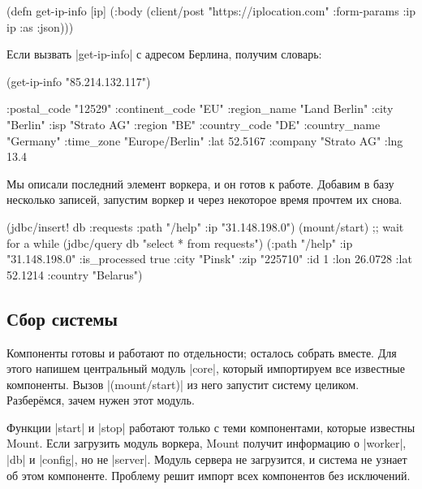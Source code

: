 \begin{english}
  \begin{clojure}
(defn get-ip-info [ip]
  (:body (client/post "https://iplocation.com"
                      {:form-params {:ip ip}
                       :as :json})))
  \end{clojure}
\end{english}

Если вызвать \spverb|get-ip-info| с адресом Берлина, получим словарь:

\begin{english}
  \begin{clojure}
(get-ip-info "85.214.132.117")

{:postal_code "12529"
 :continent_code "EU"
 :region_name "Land Berlin"
 :city "Berlin"
 :isp "Strato AG"
 :region "BE"
 :country_code "DE"
 :country_name "Germany"
 :time_zone "Europe/Berlin"
 :lat 52.5167
 :company "Strato AG"
 :lng 13.4}
  \end{clojure}
\end{english}

Мы описали последний элемент воркера, и он готов к работе. Добавим в базу
несколько записей, запустим воркер и через некоторое время прочтем их снова.

\begin{english}
  \begin{clojure}
(jdbc/insert! db :requests {:path "/help" :ip "31.148.198.0"})
(mount/start)
;; wait for a while
(jdbc/query db "select * from requests")
({:path "/help" :ip "31.148.198.0" :is_processed true
  :city "Pinsk" :zip "225710" :id 1
  :lon 26.0728 :lat 52.1214 :country "Belarus"})
  \end{clojure}
\end{english}

\subsection{Сбор системы}

Компоненты готовы и работают по отдельности; осталось собрать вместе. Для этого
напишем центральный модуль \spverb|core|, который импортируем все известные
компоненты. Вызов \spverb|(mount/start)| из него запустит систему
целиком. Разбер\"{е}мся, зачем нужен этот модуль.

Функции \spverb|start| и \spverb|stop| работают только с теми компонентами,
которые известны Mount. Если загрузить модуль воркера, Mount получит информацию
о \spverb|worker|, \spverb|db| и \spverb|config|, но не \spverb|server|. Модуль
сервера не загрузится, и система не узнает об этом компоненте. Проблему решит
импорт всех компонентов без исключений.

